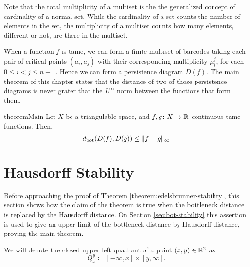 Note that the total multiplicity of a multiset is the the generalized concept of cardinality of a normal set. While the cardinality of a set counts the number of elements in the set, the multiplicity of a multiset counts how many elements, different or not, are there in the multiset.

When a function $ f $ is tame, we can form a finite multiset of barcodes taking each pair of critical points $ (a_i, a_j) $ with their corresponding multiplicity $ \mu_i^j $, for each $ 0 \leq i < j \leq n+ 1 $. Hence we can form a persistence diagram $ D(f) $. The main theorem of this chapter states that the distance of two of those persistence diagrams is never grater that the $L^\infty $ norm between the functions that form them.

\begin{restatable}{theorem}{Main} \label{theorem:edelsbrunner-stability}
    Let $ X $ be a triangulable space, and $ f, g\colon X \to \mathbb R $ continuous tame functions. Then,
    \begin{align}
        d_{\operatorname{bot}} (D(f), D(g)) \leq \|f-g\|_\infty
    \end{align}
\end{restatable}

\section{Hausdorff Stability}

Before approaching the proof of Theorem \ref{theorem:edelsbrunner-stability}, this section shows how the claim of the theorem is true when the bottleneck distance is replaced by the Hausdorff distance. On Section \ref{sec:bot-stability} this assertion is used to give an upper limit of the bottleneck distance by Hausdorff distance, proving the main theorem.

We will denote the closed upper left quadrant of a point $ (x, y) \in \mathbb R^2 $ as 
\begin{equation}
    Q_x^y \coloneq [-\infty, x] \times [y, \infty].
\end{equation}

